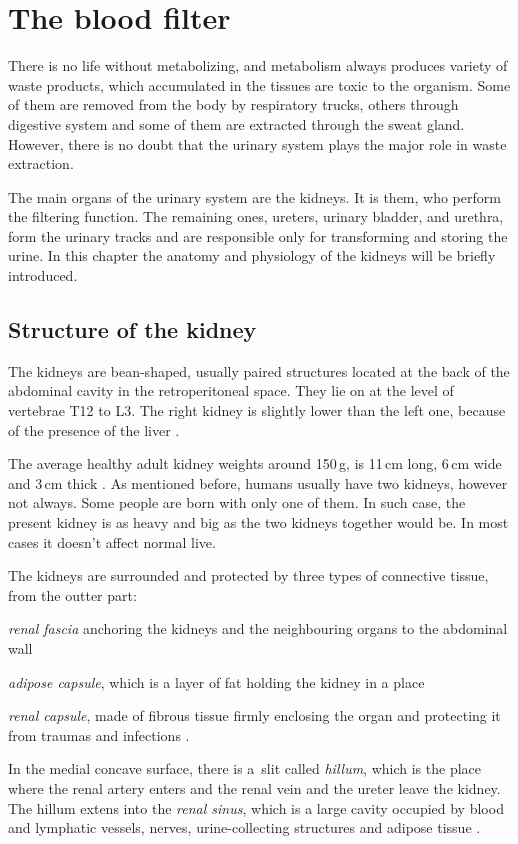 \chapter{The blood filter}
	
There is no life without metabolizing, and metabolism always produces variety of waste products, which accumulated in the tissues are toxic to the organism. Some of them are removed from the body by respiratory trucks, others through digestive system and some of them are extracted through the sweat gland. However, there is no doubt that the urinary system plays the major role in waste extraction.

The main organs of the urinary system are the kidneys. It is them, who perform the filtering function. The remaining ones,  ureters, urinary bladder, and urethra, form the urinary tracks and are responsible only for transforming and storing the urine. In this chapter the anatomy and physiology of the kidneys will be briefly introduced.

\section{Structure of the kidney} 

The kidneys are  bean-shaped, usually paired structures located at the back of the abdominal cavity in the retroperitoneal space. They lie on at the level of vertebrae T12 to L3.
The right kidney is slightly lower than the left one, because of the presence of the liver \cite{saladin, health_and_disease}. 

The average healthy adult kidney weights around 150\,g, is 11\,cm long, 6\,cm wide and 3\,cm thick \cite{kidney_dimensions, saladin}. As mentioned before, humans usually have two kidneys, however not always.  Some people are born with only one of them.  In such case, the present kidney is as heavy and big as the two kidneys together would be. In most cases it doesn't affect normal live. 

The kidneys are surrounded and protected by three types of connective tissue, from the outter part: 
\begin{inparaenum}[(1\upshape)]
\item \textit{renal fascia} anchoring the kidneys and the neighbouring organs to the abdominal wall
\item \textit{adipose capsule}, which is a layer of fat holding the kidney in a place
\item \textit{renal capsule}, made of fibrous tissue firmly enclosing the organ and protecting it from traumas and infections \cite{saladin, health_and_disease}.
\end{inparaenum} In the medial concave surface, there is a~slit called \textit{hillum}, which is the place where the  renal  artery enters and the renal vein and the ureter leave the kidney. The hillum extens into the \textit{renal sinus}, which is a large cavity occupied by blood and lymphatic vessels, nerves, urine-collecting structures and adipose tissue \cite{health_and_disease}.

